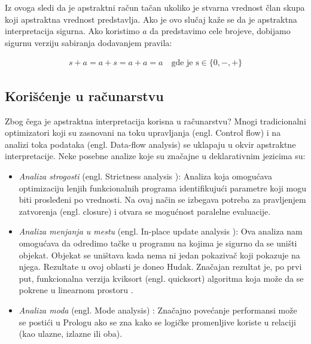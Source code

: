 Iz ovoga sledi da je apstraktni račun tačan ukoliko je stvarna vrednost član skupa koji apstraktna vrednost predstavlja. Ako je ovo slučaj kaže se da je apstraktna interpretacija sigurna. Ako koristimo $a$ da predstavimo cele brojeve, dobijamo sigurnu verziju sabiranja dodavanjem pravila:

\begin{multline}	
	s + a = a + s = a + a = a \quad \text{gde je s} \in \{0, -, +\}
\end{multline}
\cite{AbramskyHankin}

\subsection{Korišćenje u računarstvu}
\label{subsec:problem1}
Zbog čega je apstraktna interpretacija korisna u računarstvu? Mnogi tradicionalni optimizatori koji su zasnovani na toku upravljanja (engl. Control flow) i na analizi toka podataka (engl. Data-flow analysis) se uklapaju u okvir apstraktne interpretacije. Neke posebne analize koje su značajne u deklarativnim jezicima su:

\begin{itemize}
\item \textit{Analiza strogosti} (engl. Strictness analysis \cite{AbramskyHankin}):
Analiza koja omogućava optimizaciju lenjih funkcionalnih programa identifikujući parametre koji mogu biti prosleđeni po vrednosti. Na ovaj način se izbegava potreba za pravljenjem zatvorenja (engl. closure) i otvara se mogućnost paralelne evaluacije. 

\item \textit{Analiza menjanja u mestu} (engl. In-place update analysis \cite{CannPhd}):
Ova analiza nam omogućava da odredimo tačke u programu na kojima je sigurno da se uništi objekat. Objekat se uništava kada nema ni jedan pokazivač koji pokazuje na njega. Rezultate u ovoj oblasti je doneo Hudak. Značajan rezultat je, po prvi put, funkcionalna verzija kviksort (engl. quicksort) algoritma koja može da se pokrene u linearnom prostoru \cite{Girard1987}. 


\item \textit{Analiza moda} (engl. Mode analysis) \cite{AbramskyHankin}:
Značajno povećanje performansi može se postići u Prologu ako se zna kako se logičke promenljive koriste u relaciji (kao ulazne, izlazne ili oba).

\end{itemize}


